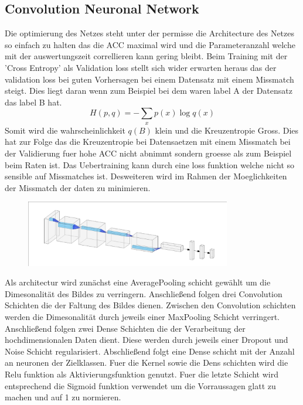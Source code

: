 \subsection{Convolution Neuronal Network}%
\label{sub:convolution_neuronal_network}

Die optimierung des Netzes steht unter der permisse die Architecture des Netzes
so einfach zu halten das die ACC maximal wird und die Parameteranzahl welche mit
der auswertungszeit correllieren kann gering bleibt. 
Beim Training mit der 'Cross Entropy' als Validation loss stellt sich wider
erwarten heraus das der validation loss bei guten Vorhersagen bei einem
Datensatz mit einem Missmatch steigt. 
Dies liegt daran wenn zum Beispiel bei dem waren label A der Datensatz das label
B hat. 
\begin{equation}
		H(p,q) = -\sum_x p(x) \log q(x)
\end{equation}
Somit wird die wahrscheinlichkeit $q(B)$ klein und die Kreuzentropie Gross.
Dies hat zur Folge das die Kreuzentropie bei Datensaetzen mit einem Missmatch
bei der Validierung fuer hohe ACC nicht abnimmt sondern groesse als zum Beispiel
beim Raten ist.
Das Uebertraining kann durch eine loss funktion welche nicht so sensible auf
Missmatches ist. 
Desweiteren wird im Rahmen der Moeglichkeiten der Missmatch der daten zu
minimieren.

\begin{figure}[h]
		\centering
		\includegraphics[width=0.8\textwidth]{pictures/architecture.pdf}
		\caption{}
		\label{fig:}
\end{figure}

Als architectur wird zunächst eine AveragePooling schicht gewählt um die
Dimesonalität des Bildes zu verringern.
Anschließend folgen drei Convolution Schichten die der Faltung des Bildes
dienen. 
Zwischen den Convolution schichten werden die Dimesonalität durch jeweils einer
MaxPooling Schicht verringert. 
Anschließend folgen zwei Dense Schichten die der Verarbeitung der
hochdimensionalen Daten dient. 
Diese werden durch jeweils einer Dropout und Noise Schicht regularisiert. 
Abschließend folgt eine Dense schicht mit der Anzahl an neuronen der
Zielklassen.
Fuer die Kernel sowie die Dens schichten wird die Relu funktion als
Aktivierungsfunktion genutzt.
Fuer die letzte Schicht wird entsprechend die Sigmoid funktion verwendet um die
Vorraussagen glatt zu machen und auf 1 zu normieren.
